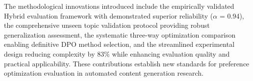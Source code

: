 The methodological innovations introduced include the empirically validated Hybrid evaluation framework with demonstrated superior reliability (\(\alpha\) = 0.94), the comprehensive unseen topic validation protocol providing robust generalization assessment, the systematic three-way optimization comparison enabling definitive DPO method selection, and the streamlined experimental design reducing complexity by 83\% while enhancing evaluation quality and practical applicability. These contributions establish new standards for preference optimization evaluation in automated content generation research.